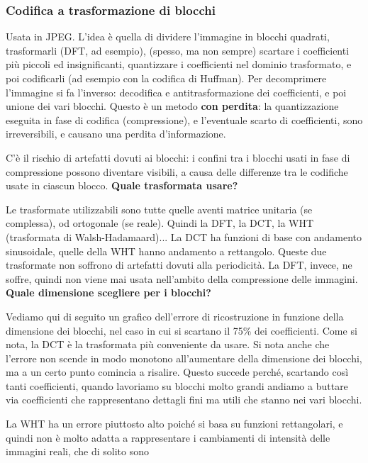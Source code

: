 \documentclass[a4paper,11pt]{article}
\begin{document}
\subsubsection{Codifica a trasformazione di blocchi}
Usata in JPEG.
L'idea è quella di dividere l'immagine in blocchi quadrati, trasformarli (DFT, ad esempio), (spesso, ma non sempre) scartare i coefficienti più piccoli ed insignificanti, quantizzare i coefficienti nel dominio trasformato, e poi codificarli (ad esempio con la codifica di Huffman).
Per decomprimere l'immagine si fa l'inverso: decodifica e antitrasformazione dei coefficienti, e poi unione dei vari blocchi.
Questo è un metodo \textbf{con perdita}: la quantizzazione eseguita in fase di codifica (compressione), e l'eventuale scarto di coefficienti, sono irreversibili, e causano una perdita d'informazione.
\par
C'è il rischio di artefatti dovuti ai blocchi: i confini tra i blocchi usati in fase di compressione possono diventare visibili, a causa delle differenze tra le codifiche usate in ciascun blocco.
\newline
\newline
\textbf{Quale trasformata usare?}
\par
Le trasformate utilizzabili sono tutte quelle aventi matrice unitaria (se complessa), od ortogonale (se reale). Quindi la DFT, la DCT, la WHT (trasformata di Walsh-Hadamaard)...
La DCT ha funzioni di base con andamento sinusoidale, quelle della WHT hanno andamento a rettangolo. Queste due trasformate non soffrono di artefatti dovuti alla periodicità. La DFT, invece, ne soffre, quindi
non viene mai usata nell'ambito della compressione delle immagini.
\newline
\newline
\textbf{Quale dimensione scegliere per i blocchi?}
\par
Vediamo qui di seguito un grafico dell'errore di ricostruzione in funzione della dimensione dei blocchi, nel caso in cui si scartano il 75\% dei coefficienti. Come si nota, la DCT è la trasformata più conveniente da usare.
Si nota anche che l'errore non scende in modo monotono all'aumentare della dimensione dei blocchi, ma a un certo punto comincia a risalire. Questo succede perché, scartando così tanti coefficienti,
quando lavoriamo su blocchi molto grandi andiamo a buttare via coefficienti che rappresentano dettagli fini ma utili che stanno nei vari blocchi.
\par
La WHT ha un errore piuttosto alto poiché si basa su funzioni rettangolari, e quindi non è molto adatta a rappresentare i cambiamenti di intensità delle immagini reali, che di solito sono
\end{document}
